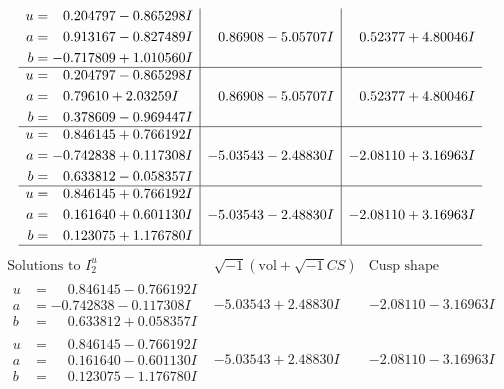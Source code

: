 \documentclass[1p]{elsarticle_modified}
\theoremstyle{definition}
\newcommand{\I}{\sqrt{-1}}
\begin{document}
$$\begin{array}{c|c|c}
\begin{aligned}
u &= \phantom{-}0.204797 - 0.865298 I \\
a &= \phantom{-}0.913167 - 0.827489 I \\
b &= -0.717809 + 1.010560 I\end{aligned}
 & \phantom{-}0.86908 - 5.05707 I & \phantom{-}0.52377 + 4.80046 I \\ \hline\begin{aligned}
u &= \phantom{-}0.204797 - 0.865298 I \\
a &= \phantom{-}0.79610 + 2.03259 I \\
b &= \phantom{-}0.378609 - 0.969447 I\end{aligned}
 & \phantom{-}0.86908 - 5.05707 I & \phantom{-}0.52377 + 4.80046 I \\ \hline\begin{aligned}
u &= \phantom{-}0.846145 + 0.766192 I \\
a &= -0.742838 + 0.117308 I \\
b &= \phantom{-}0.633812 - 0.058357 I\end{aligned}
 & -5.03543 - 2.48830 I & -2.08110 + 3.16963 I \\ \hline\begin{aligned}
u &= \phantom{-}0.846145 + 0.766192 I \\
a &= \phantom{-}0.161640 + 0.601130 I \\
b &= \phantom{-}0.123075 + 1.176780 I\end{aligned}
 & -5.03543 - 2.48830 I & -2.08110 + 3.16963 I\\
 \hline 
 \end{array}$$\newpage$$\begin{array}{c|c|c}  
\text{Solutions to }I^u_{2}& \I (\text{vol} + \sqrt{-1}CS) & \text{Cusp shape}\\
 \hline 
\begin{aligned}
u &= \phantom{-}0.846145 - 0.766192 I \\
a &= -0.742838 - 0.117308 I \\
b &= \phantom{-}0.633812 + 0.058357 I\end{aligned}
 & -5.03543 + 2.48830 I & -2.08110 - 3.16963 I \\ \hline\begin{aligned}
u &= \phantom{-}0.846145 - 0.766192 I \\
a &= \phantom{-}0.161640 - 0.601130 I \\
b &= \phantom{-}0.123075 - 1.176780 I\end{aligned}
 & -5.03543 + 2.48830 I & -2.08110 - 3.16963 I \\ \hline\begin{aligned}

\end{aligned}
\end{array}$$
\end{document}

